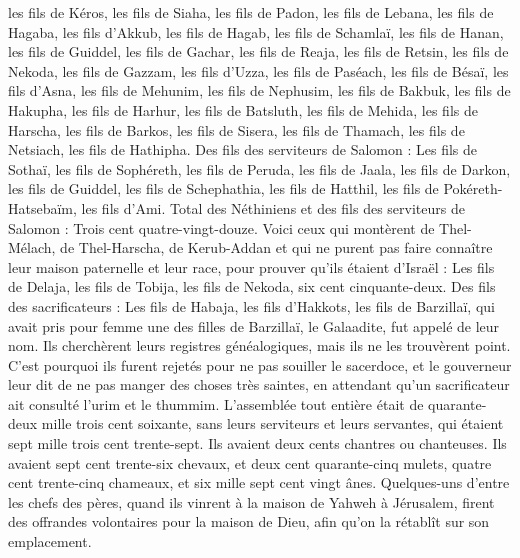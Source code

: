 \begin{multicols}{2}
les fils de Kéros, les fils de Siaha, les fils de Padon,
les fils de Lebana, les fils de Hagaba, les fils d'Akkub,
les fils de Hagab, les fils de Schamlaï, les fils de Hanan,
les fils de Guiddel, les fils de Gachar, les fils de Reaja,
les fils de Retsin, les fils de Nekoda, les fils de Gazzam,
les fils d'Uzza, les fils de Paséach, les fils de Bésaï,
les fils d'Asna, les fils de Mehunim, les fils de Nephusim,
les fils de Bakbuk, les fils de Hakupha, les fils de Harhur,
les fils de Batsluth, les fils de Mehida, les fils de Harscha,
les fils de Barkos, les fils de Sisera, les fils de Thamach,
les fils de Netsiach, les fils de Hathipha.
Des fils des serviteurs de Salomon : Les fils de Sothaï, les fils de Sophéreth, les fils de Peruda,
les fils de Jaala, les fils de Darkon, les fils de Guiddel,
les fils de Schephathia, les fils de Hatthil, les fils de Pokéreth-Hatsebaïm, les fils d'Ami.
Total des Néthiniens et des fils des serviteurs de Salomon : Trois cent quatre-vingt-douze.
Voici ceux qui montèrent de Thel-Mélach, de Thel-Harscha, de Kerub-Addan et qui ne purent pas faire connaître leur maison paternelle et leur race, pour prouver qu’ils étaient d'Israël :
Les fils de Delaja, les fils de Tobija, les fils de Nekoda, six cent cinquante-deux.
Des fils des sacrificateurs : Les fils de Habaja, les fils d'Hakkots, les fils de Barzillaï, qui avait pris pour femme une des filles de Barzillaï, le Galaadite, fut appelé de leur nom.
Ils cherchèrent leurs registres généalogiques, mais ils ne les trouvèrent point. C'est pourquoi ils furent rejetés pour ne pas souiller le sacerdoce,
et le gouverneur leur dit de ne pas manger des choses très saintes, en attendant qu'un sacrificateur ait consulté l'urim et le thummim.
L’assemblée tout entière était de quarante-deux mille trois cent soixante,
sans leurs serviteurs et leurs servantes, qui étaient sept mille trois cent trente-sept. Ils avaient deux cents chantres ou chanteuses.
Ils avaient sept cent trente-six chevaux, et deux cent quarante-cinq mulets,
quatre cent trente-cinq chameaux, et six mille sept cent vingt ânes.
Quelques-uns d'entre les chefs des pères, quand ils vinrent à la maison de Yahweh à Jérusalem, firent des offrandes volontaires pour la maison de Dieu, afin qu'on la rétablît sur son emplacement.

\end{multicols}
